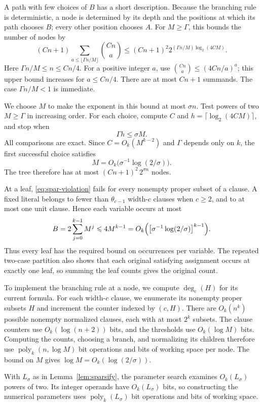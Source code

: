 \documentclass[11pt,reqno]{amsart}
\numberwithin{equation}{section}
\theoremstyle{definition}\newtheorem{definition}[theorem]{Definition}
\theoremstyle{remark}\newtheorem{remark}[theorem]{Remark}
\newcommand{\poly}{\operatorname{poly}}
\renewcommand{\le}{\leqslant}
\renewcommand{\ge}{\geqslant}
\begin{document}
A path with few choices of $B$ has a short description.
Because the branching rule is deterministic, a node is determined
by its depth and the positions at which its path chooses $B$;
every other position chooses $A$.
For $M\ge\Gamma$, this bounds the number of nodes by
\[
 (Cn+1)\sum_{a\le\lfloor\Gamma n/M\rfloor}\binom{Cn}{a}
 \le (Cn+1)^2
       2^{(\Gamma n/M)\log_2(4CM)}.
\]
Here $\Gamma n/M\le n\le Cn/4$.
For a positive integer $a$, use
$\binom{Cn}{a}\le(4Cn/a)^a$; this upper bound increases for
$a\le Cn/4$.
There are at most $Cn+1$ summands.
The case $\Gamma n/M<1$ is immediate.

We choose $M$ to make the exponent in this bound at most $\sigma n$.
Test powers of two $M\ge\Gamma$ in increasing order.
For each choice, compute $C$ and $h=\lceil\log_2(4CM)\rceil$,
and stop when
\[
 \Gamma h\le\sigma M.
\]
All comparisons are exact. Since $C=O_k(M^{k-2})$ and $\Gamma$
depends only on $k$, the first successful choice satisfies
\[
 M=O_k\bigl(\sigma^{-1}\log(2/\sigma)\bigr).
\]
The tree therefore has at most $(Cn+1)^2\,2^{\sigma n}$ nodes.

At a leaf, \eqref{eq:spar-violation} fails for every nonempty proper
subset of a clause.
A fixed literal belongs to fewer than $\theta_{c-1}$ width-$c$
clauses when $c\ge2$, and to at most one unit clause. Hence each variable
occurs at most
\[
 B=2\sum_{j=0}^{k-1}M^j
   \le4M^{k-1}
   =O_k\Bigl(\bigl[\sigma^{-1}\log(2/\sigma)\bigr]^{k-1}\Bigr).
\]
Thus every leaf has the required bound on occurrences per variable.
The repeated two-case partition also shows that each original
satisfying assignment occurs at exactly one leaf, so summing the
leaf counts gives the original count.

To implement the branching rule at a node, we compute $\deg_c(H)$
for its current formula. For each width-$c$ clause, we enumerate
its nonempty proper subsets $H$ and increment the counter indexed
by $(c,H)$. There are $O_k(n^k)$ possible nonempty normalized clauses,
each with at most $2^k$ subsets. The clause counters use
$O_k(\log(n+2))$ bits, and the thresholds use $O_k(\log M)$ bits.
Computing the counts, choosing a branch, and normalizing its children
therefore use $\poly_k(n,\log M)$ bit operations and bits of working
space per node. The bound on $M$ gives
$\log M=O_k(\log(2/\sigma))$.

With $L_\sigma$ as in Lemma~\ref{lem:sparsify}, the parameter search
examines $O_k(L_\sigma)$ powers of two. Its integer operands have
$O_k(L_\sigma)$ bits, so constructing the numerical parameters uses
$\poly_k(L_\sigma)$ bit operations and bits of working space.
\end{document}
